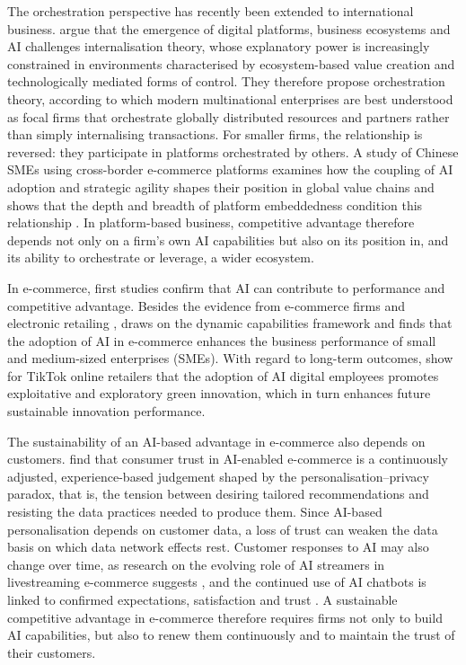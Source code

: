 The orchestration perspective has recently been extended to international business. \textcite[689]{slrR213} argue that the emergence of digital platforms, business ecosystems and AI challenges internalisation theory, whose explanatory power is increasingly constrained in environments characterised by ecosystem-based value creation and technologically mediated forms of control. They therefore propose orchestration theory, according to which modern multinational enterprises are best understood as focal firms that orchestrate globally distributed resources and partners rather than simply internalising transactions. For smaller firms, the relationship is reversed: they participate in platforms orchestrated by others. A study of Chinese SMEs using cross-border e-commerce platforms examines how the coupling of AI adoption and strategic agility shapes their position in global value chains and shows that the depth and breadth of platform embeddedness condition this relationship \parencite[1250]{slrR216}. In platform-based business, competitive advantage therefore depends not only on a firm's own AI capabilities but also on its position in, and its ability to orchestrate or leverage, a wider ecosystem.

In e-commerce, first studies confirm that AI can contribute to performance and competitive advantage. Besides the evidence from e-commerce firms \parencite[1]{chen2022} and electronic retailing \parencite[1]{bunea2026}, \textcite[1]{aljarboa2024} draws on the dynamic capabilities framework and finds that the adoption of AI in e-commerce enhances the business performance of small and medium-sized enterprises (SMEs). With regard to long-term outcomes, \textcite[1]{wang2025} show for TikTok online retailers that the adoption of AI digital employees promotes exploitative and exploratory green innovation, which in turn enhances future sustainable innovation performance.

The sustainability of an AI-based advantage in e-commerce also depends on customers. \textcite[1]{vu2026} find that consumer trust in AI-enabled e-commerce is a continuously adjusted, experience-based judgement shaped by the personalisation--privacy paradox, that is, the tension between desiring tailored recommendations and resisting the data practices needed to produce them. Since AI-based personalisation depends on customer data, a loss of trust can weaken the data basis on which data network effects rest. Customer responses to AI may also change over time, as research on the evolving role of AI streamers in livestreaming e-commerce suggests \parencite[1]{yuan2025}, and the continued use of AI chatbots is linked to confirmed expectations, satisfaction and trust \parencite[1]{gao2025}. A sustainable competitive advantage in e-commerce therefore requires firms not only to build AI capabilities, but also to renew them continuously and to maintain the trust of their customers.

